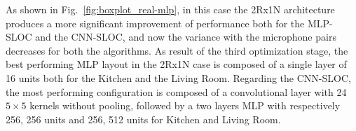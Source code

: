 \documentclass[review]{elsarticle}
\newcommand{\figref}[1]{Fig.~\ref{#1}}
\begin{document}
As shown in \figref{fig:boxplot_real-mlp}, in this case the 2Rx1N architecture produces a more significant improvement of performance both for the MLP-SLOC and the CNN-SLOC, and now the variance with the microphone pairs decreases for both the algorithms.
As result of the third optimization stage, the best performing MLP layout in the 2Rx1N case is composed of a single layer of 16 units  both for the Kitchen and the Living Room. Regarding the CNN-SLOC,  the most performing configuration is composed of a convolutional layer with 24 $5\times5$ kernels without pooling, followed by a two layers MLP with respectively 256, 256 units and 256, 512 units for Kitchen and Living Room.

%		
\end{document}
